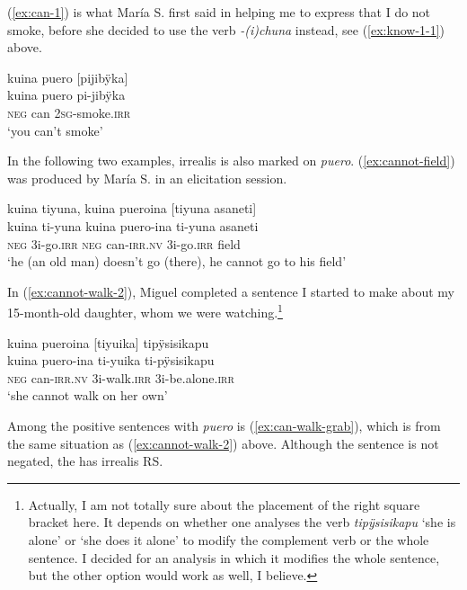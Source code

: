 (\ref{ex:can-1}) is what María S. first said in helping me to express that I do not smoke, before she decided to use the verb \textit{-(i)chuna} instead, see  (\ref{ex:know-1-1}) above.

\ea\label{ex:can-1}
\begingl
\glpreamble kuina puero \textup{[}pijibÿka\textup{]}\\
\gla kuina puero pi-jibÿka\\
\glb \textsc{neg} can 2\textsc{sg}-smoke.\textsc{irr}\\
\glft ‘you can’t smoke’
\endgl
\trailingcitation{[rxx-e120511l.379]}
\xe

In the following two examples, irrealis is also marked on \textit{puero}. (\ref{ex:cannot-field}) was produced by María S. in an elicitation session.

\ea\label{ex:cannot-field}
\begingl
\glpreamble kuina tiyuna, kuina pueroina \textup{[}tiyuna asaneti\textup{]}\\
\gla kuina ti-yuna kuina puero-ina ti-yuna asaneti\\
\glb \textsc{neg} 3i-go.\textsc{irr} \textsc{neg} can-\textsc{irr.nv} 3i-go.\textsc{irr} field\\
\glft ‘he (an old man) doesn’t go (there), he cannot go to his field’
\endgl
\trailingcitation{[rxx-e181022le]}
\xe

In (\ref{ex:cannot-walk-2}), Miguel completed a sentence I started to make about my 15-month-old daughter, whom we were watching.\footnote{Actually, I am not totally sure about the placement of the right square bracket here. It depends on whether one analyses the verb \textit{tipÿsisikapu} ‘she is alone’ or ‘she does it alone’ to modify the complement verb or the whole sentence. I decided for an analysis in which it modifies the whole sentence, but the other option would work as well, I believe.}

\ea\label{ex:cannot-walk-2}
\begingl
\glpreamble kuina pueroina \textup{[}tiyuika\textup{]} tipÿsisikapu\\
\gla kuina puero-ina ti-yuika ti-pÿsisikapu\\
\glb \textsc{neg} can-\textsc{irr.nv} 3i-walk.\textsc{irr} 3i-be.alone.\textsc{irr}\\
\glft ‘she cannot walk on her own’
\endgl
\trailingcitation{[mxx-e110820ls.008]}
\xe

Among the positive sentences with \textit{puero} is (\ref{ex:can-walk-grab}), which is from the same situation as (\ref{ex:cannot-walk-2}) above. Although the sentence is not negated, the  has irrealis RS.

